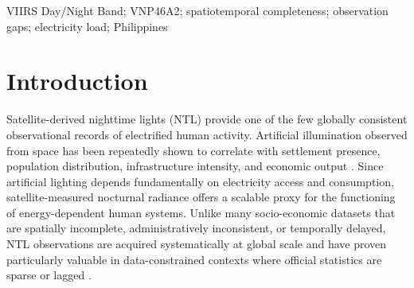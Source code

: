 \documentclass[]{interact}
\theoremstyle{plain}%
\theoremstyle{definition}
\theoremstyle{remark}
\begin{document}
\begin{keywords}
VIIRS Day/Night Band; VNP46A2; spatiotemporal completeness;
observation gaps; electricity load; Philippines
\end{keywords}


\section{Introduction}

    Satellite-derived nighttime lights (NTL) provide one of the few globally consistent observational records of electrified human activity. Artificial illumination observed from space has been repeatedly shown to correlate with settlement presence, population distribution, infrastructure intensity, and economic output \citep{Elvidge1997,Chen2011,Henderson2012}. Since artificial lighting depends fundamentally on electricity access and consumption, satellite-measured nocturnal radiance offers a scalable proxy for the functioning of energy-dependent human systems. Unlike many socio-economic datasets that are spatially incomplete, administratively inconsistent, or temporally delayed, NTL observations are acquired systematically at global scale and have proven particularly valuable in data-constrained contexts where official statistics are sparse or lagged \citep{Jean2016,Tingzon2019,Zheng2023_ISPRSJPRS_UrbanReview,Levin2025_RSE_NTL_Agenda}.
        
\end{document}
